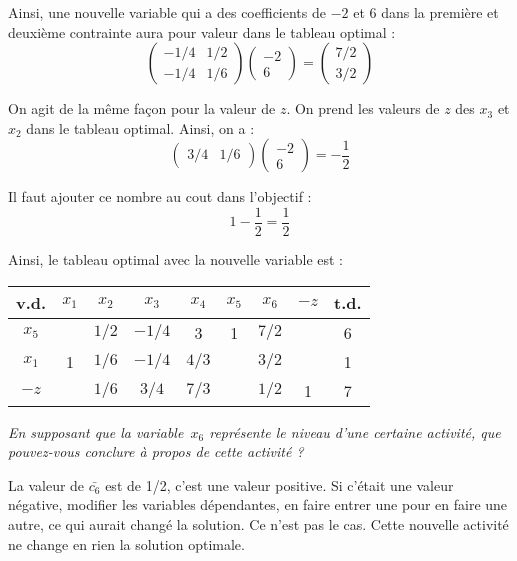 Ainsi, une nouvelle variable qui a des coefficients de $-2$ et 6 dans la première et deuxième contrainte aura pour valeur dans le tableau optimal :
\[
\begin{pmatrix}
	-1/4 & 1/2 \\
	-1/4 & 1/6
\end{pmatrix}
\begin{pmatrix}
	-2 \\
	6
\end{pmatrix}
=
\begin{pmatrix}
	7/2 \\
	3/2
\end{pmatrix}
\]

On agit de la même façon pour la valeur de $z$. On prend les valeurs de $z$ des $x_3$ et $x_2$ dans le tableau optimal. Ainsi, on a :
\[
\begin{pmatrix}
3/4 & 1/6 
\end{pmatrix}
\begin{pmatrix}
-2 \\
6
\end{pmatrix}
=
-\frac{1}{2}
\]

Il faut ajouter ce nombre au cout dans l’objectif :
\[1 -\frac{1}{2} = \frac{1}{2}\]

Ainsi, le tableau optimal avec la nouvelle variable est :

\begin{center}
	\renewcommand{\arraystretch}{1.5}
	\begin{tabular}{|c|ccccccc|c|}
		\hline
		 v.d.   & $x_{1}$ & $x_{2}$ & $x_{3}$ & $x_{4}$ & $x_{5}$ & $x_{6}$ & $-z$ & t.d. \\ \hline
		$x_{5}$ &         &  $1/2$  & $- 1/4$ &    3    &    1    &  $7/2$  &      &  6   \\
		$x_{1}$ &    1    &  $1/6$  & $- 1/4$ &  $4/3$  &         &  $3/2$  &      &  1   \\ \hline
		 $-z$   &         &  $1/6$  &  $3/4$  &  $7/3$  &         &  $1/2$  &  1   &  7   \\ \hline
	\end{tabular}
\end{center}

\emph{En supposant que la variable~$x_6$ représente le niveau d’une certaine activité, que pouvez-vous conclure à propos de cette activité ?}

La valeur de $\bar{c_6}$ est de 1/2, c’est une valeur positive. Si c’était une valeur négative, modifier les variables dépendantes, en faire entrer une pour en faire une autre, ce qui aurait changé la solution. Ce n’est pas le cas. Cette nouvelle activité ne change en rien la solution optimale.
